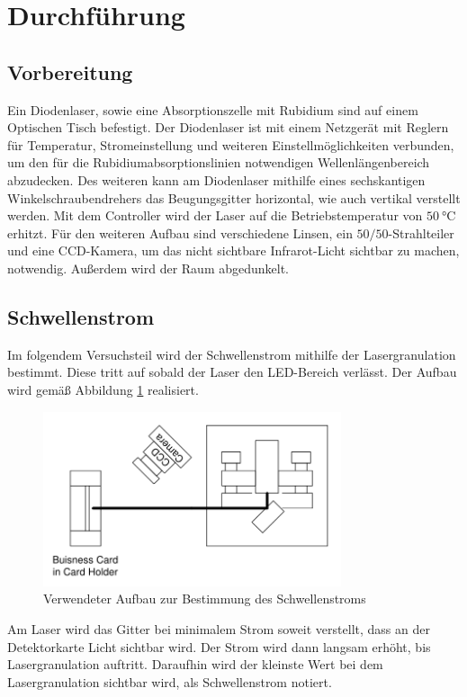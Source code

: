 \section{Durchführung}
\label{sec:Durchführung}

\subsection{Vorbereitung}
Ein Diodenlaser, sowie eine Absorptionszelle mit Rubidium sind
auf einem Optischen Tisch befestigt.
Der Diodenlaser ist mit einem Netzgerät mit Reglern für
Temperatur, Stromeinstellung und weiteren Einstellmöglichkeiten
verbunden, um den für die Rubidiumabsorptionslinien notwendigen Wellenlängenbereich abzudecken.
Des weiteren kann am Diodenlaser mithilfe eines sechskantigen
Winkelschraubendrehers das Beugungsgitter horizontal, wie auch vertikal verstellt werden.
Mit dem Controller wird der Laser auf die Betriebstemperatur von $\qty{50}{\degreeCelsius}$ erhitzt.
Für den weiteren Aufbau sind verschiedene Linsen, ein $50 / 50$-Strahlteiler
und eine CCD-Kamera, um das nicht sichtbare Infrarot-Licht sichtbar zu machen, notwendig.
Außerdem wird der Raum abgedunkelt.

\subsection{Schwellenstrom}
\label{subsec:Schwelle}
Im folgendem Versuchsteil wird der Schwellenstrom mithilfe der Lasergranulation bestimmt.
Diese tritt auf sobald der Laser den LED-Bereich verlässt.
Der Aufbau wird gemäß Abbildung \ref{pic:aufbau} realisiert. 
\begin{figure}
    \centering
    \includegraphics[width = 0.78\textwidth]{pictures/aufbau.png}
    \caption{Verwendeter Aufbau zur Bestimmung des Schwellenstroms\cite{anleitung}}
    \label{pic:aufbau}
\end{figure}
Am Laser wird das Gitter bei minimalem Strom soweit verstellt, dass an der Detektorkarte Licht sichtbar wird.
Der Strom wird dann langsam erhöht, bis Lasergranulation auftritt.
Daraufhin wird der kleinste Wert bei dem Lasergranulation sichtbar wird, als Schwellenstrom notiert.

